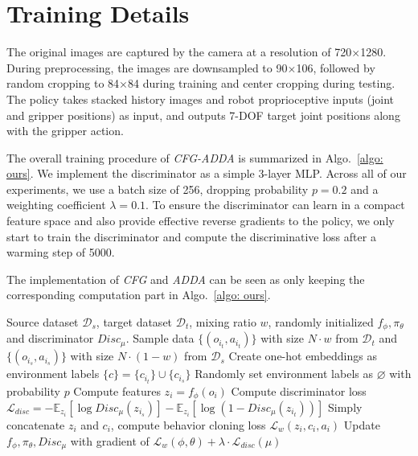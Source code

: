 \section{Training Details}
\label{appdx: training details}

The original images are captured by the camera at a resolution of 720$\times$1280. During
preprocessing, the images are downsampled to 90$\times$106, followed by random cropping to 84$\times$84
during training and center cropping during testing. The policy takes stacked history images and robot
proprioceptive inputs (joint and gripper positions) as input, and outputs 7-DOF target joint positions
along with the gripper action.

The overall training procedure of \textit{CFG-ADDA} is summarized in Algo.~\ref{algo: ours}.
We implement the discriminator as a simple 3-layer MLP.
Across all of our experiments, we use a batch size of 256, dropping probability $p=0.2$ and a weighting coefficient $\lambda=0.1$.
To ensure the discriminator can learn in a compact feature space and also provide effective reverse gradients to the policy, we only start to train the discriminator and compute the discriminative loss after a warming step of 5000.

The implementation of \textit{CFG} and \textit{ADDA} can be seen as only keeping the corresponding computation part in Algo.~\ref{algo: ours}.

\begin{algorithm}[htb]
   \caption{: CFG-ADDA}
   \label{algo: ours}
\begin{algorithmic}[1]
    Source dataset $\mathcal{D}_s$, target dataset $\mathcal{D}_t$, mixing ratio $w$, randomly initialized $f_\phi, \pi_\theta$ and discriminator $Disc_\mu$.
        \STATE Sample data $\{(o_{i_t},a_{i_t})\}$ with size $N\cdot w$ from $\mathcal{D}_t$ and $\{(o_{i_s},a_{i_s})\}$ with size $N\cdot(1-w)$ from $\mathcal{D}_s$
        \STATE Create one-hot embeddings as environment labels $\{c\}=\{c_{i_t}\}\cup\{c_{i_s}\}$
        \STATE Randomly set environment labels as $\varnothing$ with probability $p$
        \STATE Compute features $z_i = f_\phi(o_i)$
        \STATE Compute discriminator loss $\mathcal{L}_{disc}=-\mathbb{E}_{z_i}[\log Disc_\mu(z_{i_s})] - \mathbb{E}_{z_i}[\log(1- Disc_\mu(z_{i_t}))]$
        \STATE Simply concatenate $z_i$ and $c_i$, compute behavior cloning loss $\mathcal{L}_w(z_i, c_i, a_i)$
        \STATE Update $f_\phi, \pi_\theta,Disc_\mu$ with gradient of $\mathcal{L}_w(\phi, \theta) + \lambda \cdot \mathcal{L}_{disc}(\mu)$
   \ENDFOR
\end{algorithmic}
\end{algorithm}



